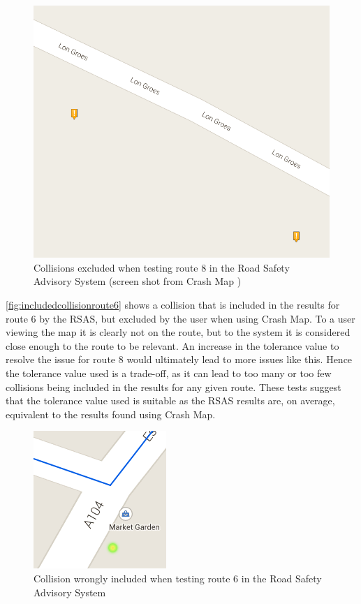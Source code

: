 \documentclass[authoryearcitations]{UoYCSproject}
\begin{document}
\begin{figure}
	\center
	\includegraphics[scale=0.5]{excludedcollisions}
	\caption{Collisions excluded when testing route 8 in the Road Safety Advisory System (screen shot from Crash Map \citep{crashmap})}
	\label{fig:excludedcollisionsroute8}
\end{figure}

\autoref{fig:includedcollisionroute6} shows a collision that is included in the results for route 6 by the RSAS, but excluded by the user when using Crash Map. To a user viewing the map it is clearly not on the route, but to the system it is considered close enough to the route to be relevant. An increase in the tolerance value to resolve the issue for route 8 would ultimately lead to more issues like this. Hence the tolerance value used is a trade-off, as it can lead to too many or too few collisions being included in the results for any given route. These tests suggest that the tolerance value used is suitable as the RSAS results are, on average, equivalent to the results found using Crash Map. 

\begin{figure}
	\center
	\includegraphics[scale=1]{incorrectlyincluded}
	\caption{Collision wrongly included when testing route 6 in the Road Safety Advisory System}
	\label{fig:includedcollisionroute6}
\end{figure}
\end{document}
